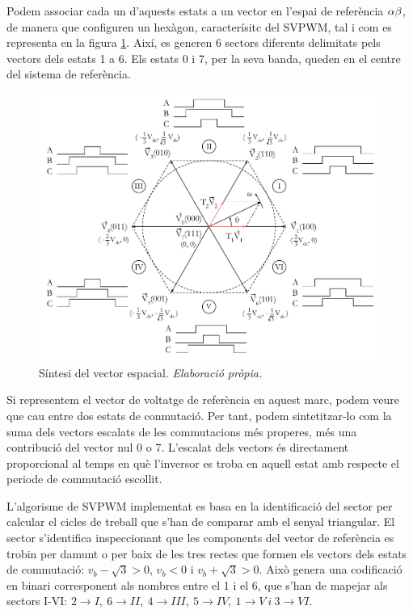 {{        Podem associar cada un d'aquests estats a un vector en l'espai de
        referència $\alpha\-\beta$, de manera que configuren un hexàgon,
        caracterísitc del SVPWM, tal i com es representa en la figura
        \ref{hexagon}. Així, es generen 6 sectors diferents delimitats pels
        vectors dels estats 1 a 6. Els estats 0 i 7, per la seva banda, queden
        en el centre del sistema de referència.

        \begin{figure}[!htb]
            \centering
            \captionsetup{justification=centering,margin=1.5cm}
            \includegraphics[width=15cm]
                { img/3_control_motor/SVPWM.pdf }
            \caption[Síntesi del vector espacial]
                { Síntesi del vector espacial. \textit{Elaboració pròpia.} }
                \label{hexagon}
        \end{figure}

        Si representem el vector de voltatge de referència en aquest marc,
        podem veure que cau entre dos estats de conmutació. Per tant, podem
        sintetitzar-lo com la suma dels vectors escalats de les commutacions
        més properes, més una contribució del vector nul 0 o 7. L'escalat dels
        vectors és directament proporcional al temps en què l'inversor es troba
        en aquell estat amb respecte el periode de commutació escollit.

        L'algorisme de SVPWM implementat es basa en la identificació del sector
        per calcular el cicles de treball que s'han de comparar amb el senyal
        triangular. El sector s'identifica inspeccionant que les components del
        vector de referència es trobin per damunt o per baix de les tres rectes
        que formen els vectors dels estats de commutació: $v_b - \sqrt{3} > 0$,
        $v_b < 0$ i $v_b + \sqrt{3} > 0$. Això genera una codificació en binari
        corresponent als nombres entre el 1 i el 6, que s'han de mapejar als
        sectors I-VI: $2 \rightarrow I,\ 6 \rightarrow II,\ 4 \rightarrow III,\
        5 \rightarrow IV,\ 1 \rightarrow V\ i\ 3 \rightarrow VI$.

}}
